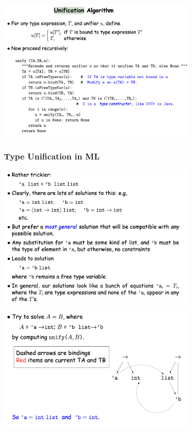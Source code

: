 \documentclass[a4paper]{exam}
\begin{document}
\begin{figure}[htbp]

  \centering
  \includegraphics[width=10cm]{img/Snipaste_2021-05-08_04-55-14.png}
  \subsubsection{Type Unification in ML}
\end{figure}

\begin{figure}[htbp]
  \centering
  \includegraphics[width=10cm]{./img/type_unification.png}
\end{figure}

\begin{figure}[htbp]
  \centering
  \includegraphics[width=10cm]{./img/type_eg.png}
\end{figure}
\end{document}
